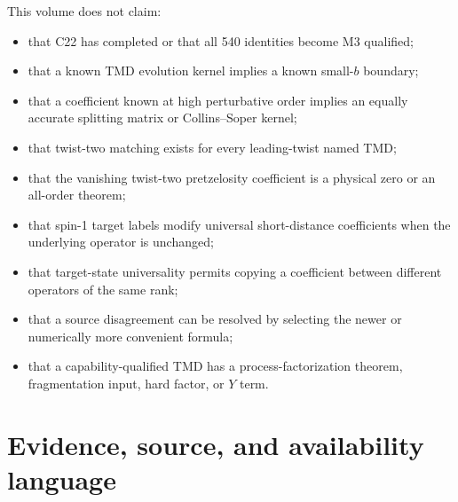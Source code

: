 \documentclass[11pt]{article}
\begin{document}
This volume does not claim:
\begin{itemize}
\item that C22 has completed or that all 540 identities become M3 qualified;
\item that a known TMD evolution kernel implies a known small-\(b\) boundary;
\item that a coefficient known at high perturbative order implies an equally accurate splitting matrix or Collins--Soper kernel;
\item that twist-two matching exists for every leading-twist named TMD;
\item that the vanishing twist-two pretzelosity coefficient is a physical zero or an all-order theorem;
\item that spin-1 target labels modify universal short-distance coefficients when the underlying operator is unchanged;
\item that target-state universality permits copying a coefficient between different operators of the same rank;
\item that a source disagreement can be resolved by selecting the newer or numerically more convenient formula;
\item that a capability-qualified TMD has a process-factorization theorem, fragmentation input, hard factor, or \(Y\) term.
\end{itemize}

\section{Evidence, source, and availability language}
\label{sec:evidence}
\end{document}
